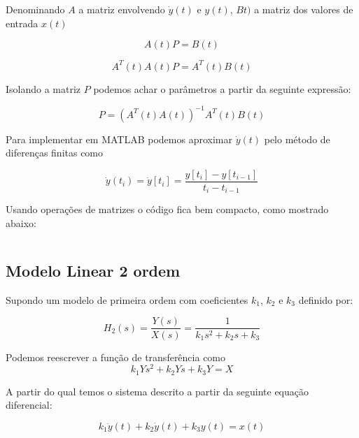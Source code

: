 \documentclass[a4paper,11pt]{article}
\begin{document}

Denominando $A$ a matriz envolvendo $\dot{y}(t)$ e $y(t)$, $Bt)$ a matriz dos valores de entrada $x(t)$

\begin{equation}
    A(t) P = B(t)
\end{equation}

\begin{equation}
    A^T(t)A(t) P = A^T(t) B(t)
\end{equation}

Isolando a matriz $P$ podemos achar o parâmetros a partir da seguinte expressão:

\begin{equation}
    P = \left(A^T(t) A(t)\right)^{-1} A^T(t) B(t)
\end{equation}

Para implementar em MATLAB podemos aproximar $\dot{y}(t)$ pelo método de diferenças finitas como

\begin{equation}
\dot{y}(t_i) = \dot{y}[t_i] = \frac{y[t_i] - y[t_{i-1}]}{t_i - t_{i-1}}
\end{equation}

Usando operações de matrizes o código fica bem compacto, como mostrado abaixo:

\inputminted[frame=single,framesep=10pt]{matlab}{../src/matlab/firstordertf.m}

\subsection{Modelo Linear 2 ordem}

Supondo um modelo de primeira ordem com coeficientes $k_1$, $k_2$ e $k_3$ definido por:

\begin{equation}\label{eq:secondordertf}
    H_2(s) = \frac{Y(s)}{X(s)} = \frac{1}{k_1 s^2+ k_2 s+ k_3}
\end{equation}


Podemos reescrever a função de transferência como
\begin{equation}
k_1 Ys^2 + k_2 Ys + k_3 Y  = X
\end{equation}

A partir do qual temos o sistema descrito a partir da seguinte equação diferencial:

\begin{equation}
k_1 \ddot{y}(t) + k_2 \dot{y}(t) + k_3 y(t) = x(t)
\end{equation}
\end{document}
